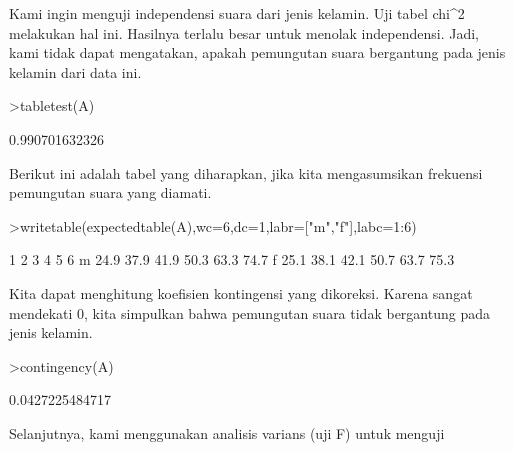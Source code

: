 \documentclass[a4paper,10pt]{article}
\begin{document}
\begin{eulernotebook}
\begin{eulercomment}
\begin{eulercomment}
\begin{eulercomment}
\begin{eulercomment}
\begin{eulercomment}
\begin{eulercomment}
\begin{eulercomment}
\begin{eulercomment}
\begin{eulercomment}
\begin{eulercomment}
\begin{eulercomment}
\begin{eulercomment}
\begin{eulercomment}
\begin{eulercomment}
\begin{eulercomment}
\begin{eulercomment}
\begin{eulercomment}
\begin{eulercomment}
\begin{eulercomment}
\begin{eulercomment}
\begin{eulercomment}
\begin{eulercomment}
\begin{eulercomment}
\begin{eulercomment}
\begin{eulercomment}
\begin{eulercomment}
\begin{eulercomment}
\begin{eulercomment}
\begin{eulercomment}
\begin{eulercomment}
\begin{eulercomment}
\begin{eulercomment}
\begin{eulercomment}
Kami ingin menguji independensi suara dari jenis kelamin. Uji tabel
chi\textasciicircum{}2 melakukan hal ini. Hasilnya terlalu besar untuk menolak
independensi. Jadi, kami tidak dapat mengatakan, apakah pemungutan
suara bergantung pada jenis kelamin dari data ini.
\end{eulercomment}
\begin{eulerprompt}
>tabletest(A)
\end{eulerprompt}
\begin{euleroutput}
  0.990701632326
\end{euleroutput}
\begin{eulercomment}
Berikut ini adalah tabel yang diharapkan, jika kita mengasumsikan
frekuensi pemungutan suara yang diamati.
\end{eulercomment}
\begin{eulerprompt}
>writetable(expectedtable(A),wc=6,dc=1,labr=["m","f"],labc=1:6)
\end{eulerprompt}
\begin{euleroutput}
             1     2     3     4     5     6
       m  24.9  37.9  41.9  50.3  63.3  74.7
       f  25.1  38.1  42.1  50.7  63.7  75.3
\end{euleroutput}
\begin{eulercomment}
Kita dapat menghitung koefisien kontingensi yang dikoreksi. Karena
sangat mendekati 0, kita simpulkan bahwa pemungutan suara tidak
bergantung pada jenis kelamin.
\end{eulercomment}
\begin{eulerprompt}
>contingency(A)
\end{eulerprompt}
\begin{euleroutput}
  0.0427225484717
\end{euleroutput}
\begin{eulercomment}
Selanjutnya, kami menggunakan analisis varians (uji F) untuk menguji

\end{eulercomment}
\end{eulercomment}
\end{eulercomment}
\end{eulercomment}
\end{eulercomment}
\end{eulercomment}
\end{eulercomment}
\end{eulercomment}
\end{eulercomment}
\end{eulercomment}
\end{eulercomment}
\end{eulercomment}
\end{eulercomment}
\end{eulercomment}
\end{eulercomment}
\end{eulercomment}
\end{eulercomment}
\end{eulercomment}
\end{eulercomment}
\end{eulercomment}
\end{eulercomment}
\end{eulercomment}
\end{eulercomment}
\end{eulercomment}
\end{eulercomment}
\end{eulercomment}
\end{eulercomment}
\end{eulercomment}
\end{eulercomment}
\end{eulercomment}
\end{eulercomment}
\end{eulercomment}
\end{eulercomment}
\end{eulernotebook}
\end{document}
